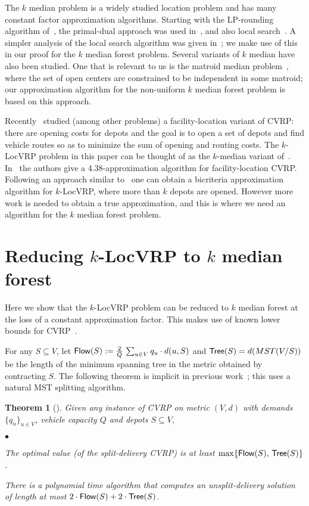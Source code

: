 \documentclass[11pt,twoside,a4paper]{article}
\newtheorem{theorem}{Theorem}
\newcommand{\initOneLiners}{\setlength{\itemsep}{0pt}
    \setlength{\parsep }{0pt}
    \setlength{\topsep }{0pt}
}
\newenvironment{OneLiners}[1][\ensuremath{\bullet}]
    {\begin{list}
        {#1}
        {\initOneLiners}}
    {\end{list}}
\newcommand{\sse}{\subseteq}
\def\lrp{$k$-LocVRP\xspace}
\begin{document}
The $k$ median problem is a widely studied location problem and has many constant factor approximation algorithms.
Starting with the LP-rounding algorithm of~\cite{CGTS99}, the primal-dual approach was used in~\cite{JV01}, and also
local search~\cite{AGKMMP04}. A simpler analysis of the local search algorithm was given in~\cite{GT08}; we make use of
this in our proof for the $k$ median forest problem. Several variants of $k$ median have also been studied. One that is
relevant to us is the matroid median problem~\cite{KKNSS11}, where the set of open centers are constrained to be
independent in some matroid; our approximation algorithm for the non-uniform $k$ median forest problem is based on this
approach.

Recently~\cite{HKM10} studied (among other problems) a facility-location variant of CVRP: there are opening costs for
depots and the goal is to open a set of depots and find vehicle routes so as to minimize the sum of opening and routing
costs. The \lrp problem in this paper can be thought of as the $k$-median variant of~\cite{HKM10}. In~\cite{HKM10} the
authors give a 4.38-approximation algorithm for facility-location CVRP. Following an approach similar to~\cite{HKM10}
one can obtain a bicriteria approximation algorithm for \lrp, where more than $k$ depots are opened. However more work
is needed to obtain a true approximation, and this is where we need an algorithm for the $k$ median forest problem.




\section{Reducing \lrp to $k$ median forest} \label{sec:redn}
\def\flow{{\sf Flow}}
\def\tree{{\sf Tree}}
\def\med{{\sf Med}}

Here we show that the \lrp problem can be reduced to $k$ median forest at the loss of a constant approximation factor.
This makes use of known lower bounds for CVRP~\cite{HK85,LS90,HKM10}.

For any $S\sse V$, let $\flow(S) := \frac2Q \, \sum_{u\in V} q_u\cdot d(u,S)$ and $\tree(S) = d(MST(V/S))$ be the
length of the minimum spanning tree in the metric obtained by contracting $S$. The following theorem is implicit in
previous work~\cite{HK85,LS90,HKM10}; this uses a natural MST splitting algorithm.
\begin{theorem}[\cite{HKM10}] \label{th:cvrp}
Given any instance of CVRP on metric $(V,d)$ with demands $\{q_u\}_{u\in V}$, vehicle capacity $Q$ and depots $S\sse
V$,
\begin{OneLiners}
 \item The optimal value (of the split-delivery CVRP) is at least $\max\{\flow(S),\,\tree(S)\}$.
 \item There is a polynomial time algorithm that computes an unsplit-delivery solution of length at most $2\cdot \flow(S)+2\cdot \tree(S)$.
\end{OneLiners}
\end{theorem}
\end{document}
